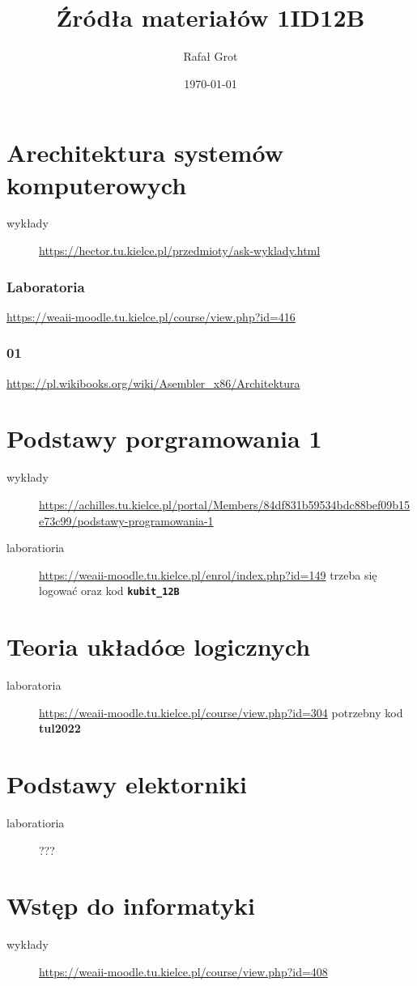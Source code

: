 \documentclass[11pt]{article}
\author{Rafał Grot}
\date{\today}
\title{Źródła materiałów 1ID12B}
\begin{document}
\maketitle
\tableofcontents


\section{Arechitektura systemów komputerowych}
\label{sec:orgedb1faf}
\begin{description}
\item[{wykłady}] \url{https://hector.tu.kielce.pl/przedmioty/ask-wyklady.html}
\end{description}
\subsubsection{Laboratoria}
\label{sec:orge5d72af}
\url{https://weaii-moodle.tu.kielce.pl/course/view.php?id=416}
\subsubsection{01}
\label{sec:org0a25f04}
\url{https://pl.wikibooks.org/wiki/Asembler\_x86/Architektura}

\section{Podstawy porgramowania 1}
\label{sec:org6ad9193}
\begin{description}
\item[{wykłady}] \url{https://achilles.tu.kielce.pl/portal/Members/84df831b59534bdc88bef09b15e73c99/podstawy-programowania-1}
\item[{laboratioria}] \url{https://weaii-moodle.tu.kielce.pl/enrol/index.php?id=149} trzeba się logować oraz kod \textbf{\texttt{kubit\_12B}}
\end{description}
\section{Teoria układóœ logicznych}
\label{sec:org5a9bdcf}
\begin{description}
\item[{laboratoria}] \url{https://weaii-moodle.tu.kielce.pl/course/view.php?id=304} potrzebny kod \textbf{tul2022}
\end{description}
\section{Podstawy elektorniki}
\label{sec:org05057d3}
\begin{description}
\item[{laboratioria}] ???
\end{description}
\section{Wstęp do informatyki}
\label{sec:orgb8d52d5}
\begin{description}
\item[{wykłady}] \url{https://weaii-moodle.tu.kielce.pl/course/view.php?id=408}
\end{description}
\end{document}

